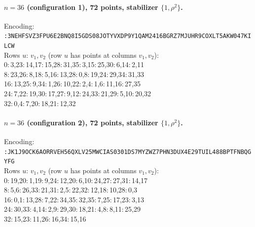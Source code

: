 \paragraph{$n=36$ (configuration 1), 72 points, stabilizer $\{1,\rho^2\}$.} Encoding:\\
{\small \texttt{:3NEHFSVZ3FPU6E2BNQ8I5GDS08JOT\allowbreak YVXDP9Y1QAM2416BGRZ7MJUHR9COXL\allowbreak T5AKW047KILCW}}\\
Rows $u:\,v_1,v_2$ (row $u$ has points at columns $v_1,v_2$):\\
{\small
  0:\,3,23:\,14,17:\,15,28:\,31,35:\,3,15:\,25,30:\,6,14:\,2,11 \\
  8:\,23,26:\,8,18:\,5,16:\,13,28:\,0,8:\,19,24:\,29,34:\,31,33 \\
  16:\,13,25:\,9,34:\,1,26:\,10,22:\,2,4:\,1,6:\,11,16:\,27,35 \\
  24:\,7,22:\,19,30:\,17,27:\,9,12:\,24,33:\,21,29:\,5,10:\,20,32 \\
  32:\,0,4:\,7,20:\,18,21:\,12,32
}

\paragraph{$n=36$ (configuration 2), 72 points, stabilizer $\{1,\rho^2\}$.} Encoding:\\
{\small \texttt{:JK1J9OCK6AORRVEH56QXLV25MWCIA\allowbreak S0301DS7MYZWZ7PHN3DUX4E29TUIL4\allowbreak 88BPTFNBQGYFG}}\\
Rows $u:\,v_1,v_2$ (row $u$ has points at columns $v_1,v_2$):\\
{\small
  0:\,19,20:\,1,19:\,9,24:\,12,20:\,6,10:\,24,27:\,27,31:\,14,17 \\
  8:\,5,6:\,26,33:\,21,31:\,2,5:\,22,32:\,12,18:\,10,28:\,0,3 \\
  16:\,0,1:\,13,28:\,7,22:\,34,35:\,32,35:\,7,25:\,17,23:\,3,13 \\
  24:\,30,33:\,4,14:\,2,9:\,29,30:\,18,21:\,4,8:\,8,11:\,25,29 \\
  32:\,15,23:\,11,26:\,16,34:\,15,16
}

